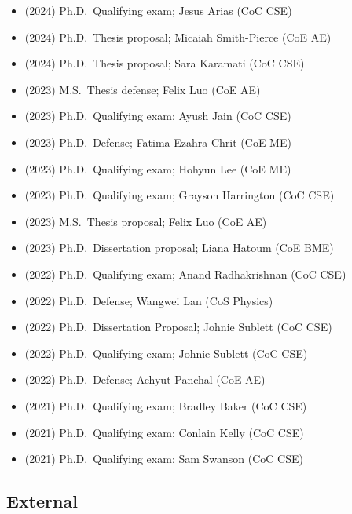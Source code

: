 \begin{itemize}
    \item (2024) Ph.D.\ Qualifying exam; Jesus Arias (CoC CSE)
    \item (2024) Ph.D.\ Thesis proposal; Micaiah Smith-Pierce (CoE AE)
    \item (2024) Ph.D.\ Thesis proposal; Sara Karamati (CoC CSE)
    \item (2023) M.S.\  Thesis defense; Felix Luo (CoE AE)
    \item (2023) Ph.D.\ Qualifying exam; Ayush Jain (CoC CSE)
    \item (2023) Ph.D.\ Defense; Fatima Ezahra Chrit (CoE ME)
    \item (2023) Ph.D.\ Qualifying exam; Hohyun Lee (CoE ME)
    \item (2023) Ph.D.\ Qualifying exam; Grayson Harrington (CoC CSE)
    \item (2023) M.S.\  Thesis proposal; Felix Luo (CoE AE)
    \item (2023) Ph.D.\ Dissertation proposal; Liana Hatoum (CoE BME)
    \item (2022) Ph.D.\ Qualifying exam; Anand Radhakrishnan (CoC CSE)
    \item (2022) Ph.D.\ Defense; Wangwei Lan (CoS Physics)
    \item (2022) Ph.D.\ Dissertation Proposal; Johnie Sublett (CoC CSE)
    \item (2022) Ph.D.\ Qualifying exam; Johnie Sublett (CoC CSE)
    \item (2022) Ph.D.\ Defense; Achyut Panchal (CoE AE)
    \item (2021) Ph.D.\ Qualifying exam; Bradley Baker (CoC CSE)
    \item (2021) Ph.D.\ Qualifying exam; Conlain Kelly (CoC CSE)
    \item (2021) Ph.D.\ Qualifying exam; Sam Swanson (CoC CSE)
\end{itemize}

\subsection{External}

